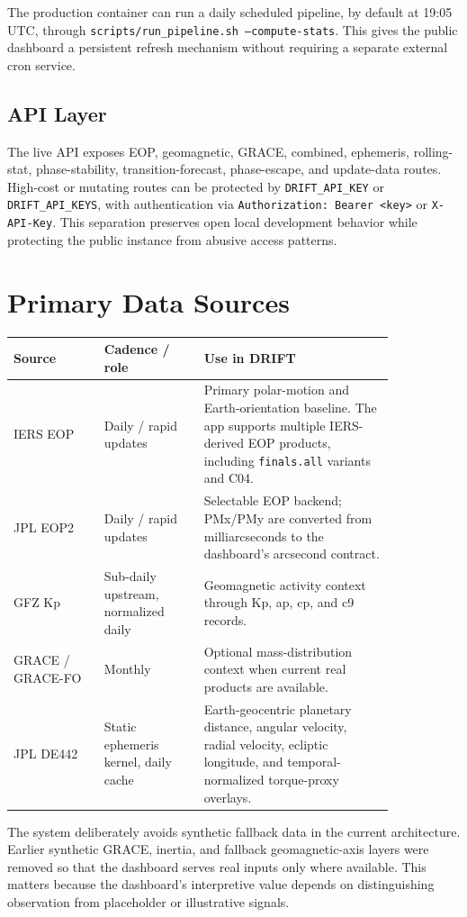 \documentclass[11pt]{article}
\newcommand{\DRIFT}{\textsc{DRIFT}}
\begin{document}
The production container can run a daily scheduled pipeline, by default at 19:05 UTC, through \texttt{scripts/run\_pipeline.sh --compute-stats}. This gives the public dashboard a persistent refresh mechanism without requiring a separate external cron service.

\subsection{API Layer}
The live API exposes EOP, geomagnetic, GRACE, combined, ephemeris, rolling-stat, phase-stability, transition-forecast, phase-escape, and update-data routes. High-cost or mutating routes can be protected by \texttt{DRIFT\_API\_KEY} or \texttt{DRIFT\_API\_KEYS}, with authentication via \texttt{Authorization: Bearer <key>} or \texttt{X-API-Key}. This separation preserves open local development behavior while protecting the public instance from abusive access patterns.

\section{Primary Data Sources}
\begin{longtable}{p{0.20\linewidth}p{0.22\linewidth}p{0.42\linewidth}}
\toprule
\textbf{Source} & \textbf{Cadence / role} & \textbf{Use in \DRIFT}\\
\midrule
IERS EOP & Daily / rapid updates & Primary polar-motion and Earth-orientation baseline. The app supports multiple IERS-derived EOP products, including \texttt{finals.all} variants and C04.\\
JPL EOP2 & Daily / rapid updates & Selectable EOP backend; PMx/PMy are converted from milliarcseconds to the dashboard's arcsecond contract.\\
GFZ Kp & Sub-daily upstream, normalized daily & Geomagnetic activity context through Kp, ap, cp, and c9 records.\\
GRACE / GRACE-FO & Monthly & Optional mass-distribution context when current real products are available.\\
JPL DE442 & Static ephemeris kernel, daily cache & Earth-geocentric planetary distance, angular velocity, radial velocity, ecliptic longitude, and temporal-normalized torque-proxy overlays.\\
\bottomrule
\end{longtable}

The system deliberately avoids synthetic fallback data in the current architecture. Earlier synthetic GRACE, inertia, and fallback geomagnetic-axis layers were removed so that the dashboard serves real inputs only where available. This matters because the dashboard's interpretive value depends on distinguishing observation from placeholder or illustrative signals.
\end{document}
